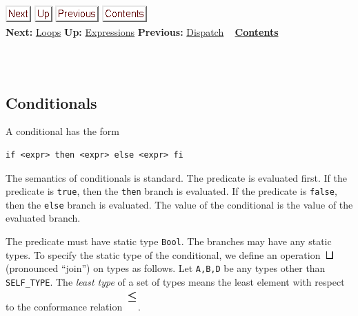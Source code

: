 \documentclass[]{article}
\begin{document}
\href{node19.html}{\includegraphics{next.png}}
\href{node13.html}{\includegraphics{up.png}}
\href{node17.html}{\includegraphics{prev.png}}
\href{node1.html}{\includegraphics{contents.png}} \\ \textbf{Next:}
\href{node19.html}{Loops} \textbf{Up:} \href{node13.html}{Expressions}
\textbf{Previous:} \href{node17.html}{Dispatch} ~
\textbf{\href{node1.html}{Contents}} \\ \\

\subsection{\\ Conditionals}

A conditional has the form

\begin{verbatim}
if <expr> then <expr> else <expr> fi
\end{verbatim}

The semantics of conditionals is standard. The predicate is evaluated
first. If the predicate is \texttt{true}, then the \texttt{then} branch
is evaluated. If the predicate is \texttt{false}, then the \texttt{else}
branch is evaluated. The value of the conditional is the value of the
evaluated branch.

The predicate must have static type \texttt{Bool}. The branches may have
any static types. To specify the static type of the conditional, we
define an operation \includegraphics{img21.png} (pronounced ``join'') on
types as follows. Let \texttt{A,B,D} be any types other than
\texttt{SELF\_TYPE}. The \emph{least type} of a set of types means the
least element with respect to the conformance relation
\includegraphics{img22.png}. \\
\end{document}
